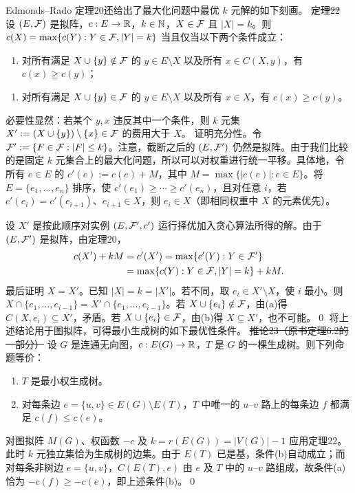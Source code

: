 Edmonds--Rado 定理20还给出了最大化问题中最优 $k$ 元解的如下刻画。
\st{定理22} 设 $(E,\mathcal F)$ 是拟阵，$c:E\to\mathbb R$，$k\in\mathbb N$，$X\in\mathcal F$ 且 $|X|=k$。则 $c(X)=\max\{c(Y):Y\in\mathcal F,|Y|=k\}$ 当且仅当以下两个条件成立：
\begin{enumerate}[label=(\alph*)]
\item 对所有满足 $X\cup\{y\}\notin\mathcal F$ 的 $y\in E\setminus X$ 以及所有 $x\in C(X,y)$，有 $c(x)\ge c(y)$；
\end{enumerate}

\begin{enumerate}[label=(\alph*),start=2]
\item 对所有满足 $X\cup\{y\}\in\mathcal F$ 的 $y\in E\setminus X$ 以及所有 $x\in X$，有 $c(x)\ge c(y)$。
\end{enumerate}
\pr 必要性显然：若某个 $y,x$ 违反其中一个条件，则 $k$ 元集 $X':=(X\cup\{y\})\setminus\{x\}\in\mathcal F$ 的费用大于 $X$。
证明充分性。令 $\mathcal F':=\{F\in\mathcal F:|F|\le k\}$。注意，截断之后的 $(E,\mathcal F')$ 仍然是拟阵。由于我们比较的是固定 $k$ 元集合上的最大化问题，所以可以对权重进行统一平移。具体地，令所有 $e\in E$ 的 $c'(e):=c(e)+M$，其中 $M=\max\{|c(e)|:e\in E\}$。将 $E=\{e_1,\ldots,e_n\}$ 排序，使 $c'(e_1)\ge\cdots\ge c'(e_n)$，且对任意 $i$，若 $c'(e_i)=c'(e_{i+1})$、$e_{i+1}\in X$，则 $e_i\in X$（即相同权重中 $X$ 的元素优先）。

设 $X'$ 是按此顺序对实例 $(E,\mathcal F',c')$ 运行择优加入贪心算法所得的解。由于 $(E,\mathcal F')$ 是拟阵，由定理20，
\begin{align*}
c(X')+kM&=c'(X')=\max\{c'(Y):Y\in\mathcal F'\}\\
&=\max\{c(Y):Y\in\mathcal F,|Y|=k\}+kM.
\end{align*}
最后证明 $X=X'$。已知 $|X|=k=|X'|$。若不同，取 $e_i\in X'\setminus X$，使 $i$ 最小。则 $X\cap\{e_1,\ldots,e_{i-1}\}=X'\cap\{e_1,\ldots,e_{i-1}\}$。若 $X\cup\{e_i\}\notin\mathcal F$，由(a)得 $C(X,e_i)\subseteq X'$，矛盾。若 $X\cup\{e_i\}\in\mathcal F$，由(b)得 $X\subseteq X'$，也不可能。\qed
将上述结论用于图拟阵，可得最小生成树的如下最优性条件。
\st{推论23（原书定理6.2的一部分）} 设 $G$ 是连通无向图，$c:E(G)\to\mathbb R$，$T$ 是 $G$ 的一棵生成树。则下列命题等价：
\begin{enumerate}[label=(\alph*)]
\item $T$ 是最小权生成树。
\item 对每条边 $e=\{u,v\}\in E(G)\setminus E(T)$，$T$ 中唯一的 $u$--$v$ 路上的每条边 $f$ 都满足 $c(f)\le c(e)$。
\end{enumerate}
\pr 对图拟阵 $M(G)$、权函数 $-c$ 及 $k=r(E(G))=|V(G)|-1$ 应用定理22。此时 $k$ 元独立集恰为生成树的边集。由于 $E(T)$ 已是基，条件(b)自动成立；而对每条非树边 $e=\{u,v\}$，$C(E(T),e)$ 由 $e$ 及 $T$ 中的 $u$--$v$ 路组成，故条件(a)恰为 $-c(f)\ge-c(e)$，即上述条件(b)。\qed

